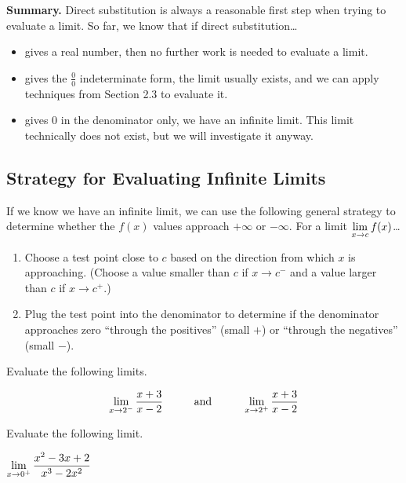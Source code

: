 \documentclass[12pt]{article}
\begin{document}
\vspace{5mm}

\textbf{Summary.} Direct substitution is always a reasonable first step when trying to evaluate a limit. So far, we know that if direct substitution\dots
\begin{itemize}
	\item gives a real number, then no further work is needed to evaluate a limit.
	\item gives the $\frac{0}{0}$ indeterminate form, the limit usually exists, and we can apply techniques from Section 2.3 to evaluate it.
	\item gives 0 in the denominator only, we have an infinite limit. This limit technically does not exist, but we will investigate it anyway.
\end{itemize}

\subsection*{Strategy for Evaluating Infinite Limits}

If we know we have an infinite limit, we can use the following general strategy to determine whether the $f(x)$ values approach $+\infty$ or $-\infty$. For a limit $\displaystyle\lim_{x\to c}f(x)$\dots
\begin{enumerate}
	\item[\tc{1}] Choose a test point close to $c$ based on the direction from which $x$ is approaching. (Choose a value smaller than $c$ if $x\to c^-$ and a value larger than $c$ if $x\to c^+$.)
	\item[\tc{2}] Plug the test point into the denominator to determine if the denominator approaches zero ``through the positives'' (small $+$) or ``through the negatives'' (small $-$).
\end{enumerate}

\newpage

\Example Evaluate the following limits.

$$\lim_{x\to 2^-}\frac{x+3}{x-2}\text{\hspace{10mm}and\hspace{10mm}}\lim_{x\to 2^+}\frac{x+3}{x-2}$$

\vspace{50mm}

\Example Evaluate the following limit.

\vspace{5mm}

\hspace{10mm} $\displaystyle\lim_{x\to 0^+}\frac{x^2-3x+2}{x^3-2x^2}$
\end{document}
